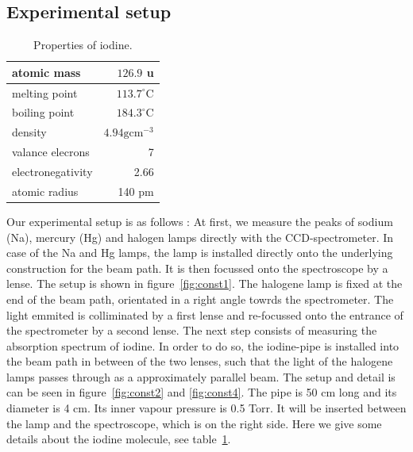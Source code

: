 \subsection{Experimental setup}
\begin{table}
\caption{Properties of iodine.}
\begin{tabular}{| l | r |}
    \hline
    atomic mass   & $126.9$ u \\
    \hline
    melting point & $113.7^{\circ}$C \\
    \hline
    boiling point & $184.3^{\circ}$C \\ 
    \hline
    density & $4.94 \text{gcm}^{-3} $ \\
    \hline
    valance elecrons & 7 \\
    \hline
    electronegativity & 2.66 \\
    \hline
    atomic radius & 140 pm \\
    \hline
\end{tabular}
\label{tab:iodine}
\end{table}


Our experimental setup is as follows \cite{versuchsanleitung}:
At first, we measure the peaks of sodium (Na), 
mercury (Hg) and halogen lamps directly with the CCD-spectrometer. 
In case of the Na and Hg lamps, the lamp is installed directly onto 
the underlying construction for the beam path. 
It is then focussed onto the spectroscope by a lense. 
The setup is shown in figure~\ref{fig:const1}.
The halogene lamp is fixed at the end of the beam path, orientated 
in a right angle towrds the spectrometer. The light emmited is 
colliminated by a first lense and re-focussed onto the entrance of 
the spectrometer by a second lense. 
The next step consists of measuring the absorption spectrum 
of iodine. In order to do so, the iodine-pipe is installed 
into the beam path in between of the two lenses, such that 
the light of the halogene lamps passes through as a approximately 
parallel beam. The setup and detail is can be seen in 
figure~\ref{fig:const2} and \ref{fig:const4}.
The pipe is 50 cm long and its diameter is 4 cm. Its inner 
vapour pressure is 0.5 Torr. It will be 
inserted between the lamp and the spectroscope, which is on 
the right side. Here we give some details \cite{weisstein} 
about the iodine molecule, see table~\ref{tab:iodine}.

